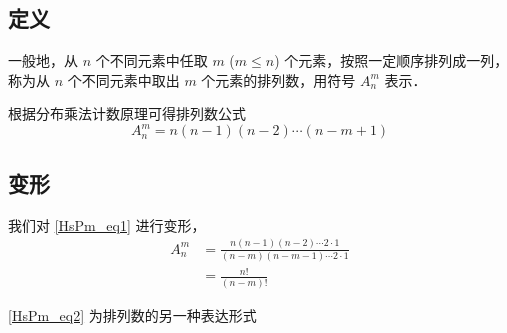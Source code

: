 
\subsection{定义}
一般地，从 $n$ 个不同元素中任取 $m$ ($m \leq n$) 个元素，按照一定顺序排列成一列，称为从 $n$ 个不同元素中取出 $m$ 个元素的排列数，用符号 $A_n^m$ 表示．

根据分布乘法计数原理可得排列数公式\begin{equation}\label{HsPm_eq1}
A_n^m = n (n - 1)(n - 2) \cdots (n - m + 1)
\end{equation}

\subsection{变形}
我们对 \autoref{HsPm_eq1} 进行变形，\begin{equation}\label{HsPm_eq2}
\begin{aligned}
A_n^m &= \frac{n(n - 1)(n - 2) \cdots 2 \cdot 1}{(n - m)(n - m - 1) \cdots 2 \cdot 1}\\
&= \frac{n!}{(n - m)!}
\end{aligned}
\end{equation}

\autoref{HsPm_eq2} 为排列数的另一种表达形式